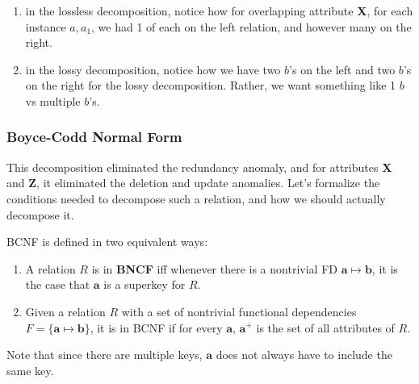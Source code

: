 \documentclass{article}
\begin{document}
\begin{example}
      \begin{enumerate}
        \item in the lossless decomposition, notice how for overlapping attribute \textbf{X}, for each instance $a, a_1$, we had 1 of each on the left relation, and however many on the right. 
        \item in the lossy decomposition, notice how we have two $b$'s on the left and two $b$'s on the right for the lossy decomposition. Rather, we want something like 1 $b$ vs multiple $b$'s.
      \end{enumerate}
    \end{example}

  \subsubsection{Boyce-Codd Normal Form}

    This decomposition eliminated the redundancy anomaly, and for attributes \textbf{X} and \textbf{Z}, it eliminated the deletion and update anomalies. Let's formalize the conditions needed to decompose such a relation, and how we should actually decompose it. 

    \begin{definition}[BNCF]
      BCNF is defined in two equivalent ways: 
      \begin{enumerate}
        \item A relation $R$ is in \textbf{BNCF} iff whenever there is a nontrivial FD $\mathbf{a} \mapsto \mathbf{b}$, it is the case that $\mathbf{a}$ is a superkey for $R$. 
        \item Given a relation $R$ with a set of nontrivial functional dependencies $F = \{\mathbf{a} \mapsto \mathbf{b}\}$, it is in BCNF if for every $\mathbf{a}$, $\mathbf{a}^+$ is the set of all attributes of $R$. 
      \end{enumerate}
      Note that since there are multiple keys, $\mathbf{a}$ does not always have to include the same key. 
    \end{definition}
\end{document}
